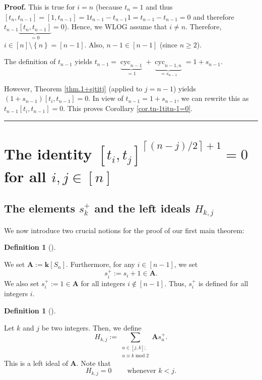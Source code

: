 \documentclass[numbers=enddot,12pt,final,onecolumn,notitlepage]{scrartcl}%
\theoremstyle{definition}
\newtheorem{defi}[theo]{Definition}
\newenvironment{definition}[1][]
{\begin{defi}[#1]\begin{leftbar}}
{\end{leftbar}\end{defi}}
\newenvironment{proof}[1][Proof]{\noindent\textbf{#1.} }{\ \rule{0.5em}{0.5em}}
\let\sumnonlimits\sum
\renewcommand{\sum}{\sumnonlimits\limits}
\begin{document}
\begin{proof}
This is true for $i=n$ (because $t_{n}=1$ and thus $\left[  t_{n}%
,t_{n-1}\right]  =\left[  1,t_{n-1}\right]  =1t_{n-1}-t_{n-1}1=t_{n-1}%
-t_{n-1}=0$ and therefore $t_{n-1}\underbrace{\left[  t_{n},t_{n-1}\right]
}_{=0}=0$). Hence, we WLOG assume that $i\neq n$. Therefore, $i\in\left[
n\right]  \setminus\left\{  n\right\}  =\left[  n-1\right]  $. Also,
$n-1\in\left[  n-1\right]  $ (since $n\geq2$).

The definition of $t_{n-1}$ yields $t_{n-1}=\underbrace{\operatorname*{cyc}%
\nolimits_{n-1}}_{=1}+\underbrace{\operatorname*{cyc}\nolimits_{n-1,n}%
}_{=s_{n-1}}=1+s_{n-1}$.

However, Theorem \ref{thm.1+sjtitj} (applied to $j=n-1$) yields $\left(
1+s_{n-1}\right)  \left[  t_{i},t_{n-1}\right]  =0$. In view of $t_{n-1}%
=1+s_{n-1}$, we can rewrite this as $t_{n-1}\left[  t_{i},t_{n-1}\right]  =0$.
This proves Corollary \ref{cor.tn-1titn-1=0}.
\end{proof}

\section{The identity $\left[  t_{i},t_{j}\right]  ^{\left\lceil \left(
n-j\right)  /2\right\rceil +1}=0$ for all $i,j\in\left[  n\right]  $}

\subsection{The elements $s_{k}^{+}$ and the left ideals $H_{k,j}$}

We now introduce two crucial notions for the proof of our first main theorem:

\begin{definition}
\label{def.si+}We set $\mathbf{A}:=\mathbf{k}\left[  S_{n}\right]  $.
Furthermore, for any $i\in\left[  n-1\right]  $, we set
\[
s_{i}^{+}:=s_{i}+1\in\mathbf{A}.
\]
We also set $s_{i}^{+}:=1\in\mathbf{A}$ for all integers $i\notin\left[
n-1\right]  $. Thus, $s_{i}^{+}$ is defined for all integers $i$.
\end{definition}

\begin{definition}
\label{def.Hkj}Let $k$ and $j$ be two integers. Then, we define%
\[
H_{k,j}:=\sum_{\substack{u\in\left[  j,k\right]  ;\\u\equiv
k\operatorname{mod}2}}\mathbf{A}s_{u}^{+}.
\]
This is a left ideal of $\mathbf{A}$. Note that%
\begin{equation}
H_{k,j}=0\ \ \ \ \ \ \ \ \ \ \text{whenever }k<j. \label{eq.def.Hkj.=0}%
\end{equation}

\end{definition}
\end{document}
